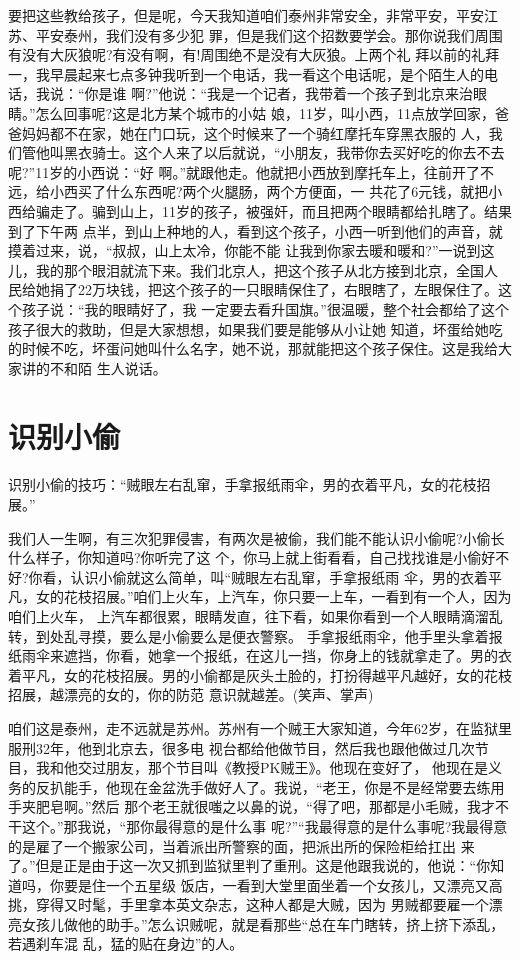 \documentclass[11pt,a4paper,onecolumn]{article}
\begin{document}
要把这些教给孩子，但是呢，今天我知道咱们泰州非常安全，非常平安，平安江苏、平安泰州，我们没有多少犯
罪，但是我们这个招数要学会。那你说我们周围有没有大灰狼呢?有没有啊，有!周围绝不是没有大灰狼。上两个礼
拜以前的礼拜一，我早晨起来七点多钟我听到一个电话，我一看这个电话呢，是个陌生人的电话，我说：``你是谁
啊?''他说：``我是一个记者，我带着一个孩子到北京来治眼睛。''怎么回事呢?这是北方某个城市的小姑
娘，11岁，叫小西，11点放学回家，爸爸妈妈都不在家，她在门口玩，这个时候来了一个骑红摩托车穿黑衣服的
人，我们管他叫黑衣骑士。这个人来了以后就说，``小朋友，我带你去买好吃的你去不去呢?''11岁的小西说：``好
啊。''就跟他走。他就把小西放到摩托车上，往前开了不远，给小西买了什么东西呢?两个火腿肠，两个方便面，一
共花了6元钱，就把小西给骗走了。骗到山上，11岁的孩子，被强奸，而且把两个眼睛都给扎瞎了。结果到了下午两
点半，到山上种地的人，看到这个孩子，小西一听到他们的声音，就摸着过来，说，``叔叔，山上太冷，你能不能
让我到你家去暖和暖和?''一说到这儿，我的那个眼泪就流下来。我们北京人，把这个孩子从北方接到北京，全国人
民给她捐了22万块钱，把这个孩子的一只眼睛保住了，右眼瞎了，左眼保住了。这个孩子说：``我的眼睛好了，我
一定要去看升国旗。''很温暖，整个社会都给了这个孩子很大的救助，但是大家想想，如果我们要是能够从小让她
知道，坏蛋给她吃的时候不吃，坏蛋问她叫什么名字，她不说，那就能把这个孩子保住。这是我给大家讲的不和陌
生人说话。


\section{识别小偷}

识别小偷的技巧：``贼眼左右乱窜，手拿报纸雨伞，男的衣着平凡，女的花枝招展。''

我们人一生啊，有三次犯罪侵害，有两次是被偷，我们能不能认识小偷呢?小偷长什么样子，你知道吗?你听完了这
个，你马上就上街看看，自己找找谁是小偷好不好?你看，认识小偷就这么简单，叫``贼眼左右乱窜，手拿报纸雨
伞，男的衣着平凡，女的花枝招展。''咱们上火车，上汽车，你只要一上车，一看到有一个人，因为咱们上火车，
上汽车都很累，眼睛发直，往下看，如果你看到一个人眼睛滴溜乱转，到处乱寻摸，要么是小偷要么是便衣警察。
手拿报纸雨伞，他手里头拿着报纸雨伞来遮挡，你看，她拿一个报纸，在这儿一挡，你身上的钱就拿走了。男的衣
着平凡，女的花枝招展。男的小偷都是灰头土脸的，打扮得越平凡越好，女的花枝招展，越漂亮的女的，你的防范
意识就越差。(笑声、掌声)

咱们这是泰州，走不远就是苏州。苏州有一个贼王大家知道，今年62岁，在监狱里服刑32年，他到北京去，很多电
视台都给他做节目，然后我也跟他做过几次节目，我和他交过朋友，那个节目叫《教授PK贼王》。他现在变好了，
他现在是义务的反扒能手，他现在金盆洗手做好人了。我说，``老王，你是不是经常要去练用手夹肥皂啊。''然后
那个老王就很嗤之以鼻的说，``得了吧，那都是小毛贼，我才不干这个。''那我说，``那你最得意的是什么事
呢?''``我最得意的是什么事呢?我最得意的是雇了一个搬家公司，当着派出所警察的面，把派出所的保险柜给扛出
来了。''但是正是由于这一次又抓到监狱里判了重刑。这是他跟我说的，他说：``你知道吗，你要是住一个五星级
饭店，一看到大堂里面坐着一个女孩儿，又漂亮又高挑，穿得又时髦，手里拿本英文杂志，这种人都是大贼，因为
男贼都要雇一个漂亮女孩儿做他的助手。''怎么识贼呢，就是看那些``总在车门瞎转，挤上挤下添乱，若遇刹车混
乱，猛的贴在身边''的人。
\end{document}
